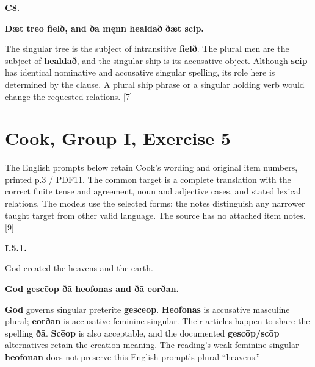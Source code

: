 \par\begin{minipage}{\linewidth}\raggedright
\textbf{C8.}

\textbf{Ðæt trēo fielð, and ðā męnn healdað ðæt scip.}

The singular tree is the subject of intransitive \textbf{fielð}. The plural men are the subject of \textbf{healdað}, and the singular ship is its accusative object. Although \textbf{scip} has identical nominative and accusative singular spelling, its role here is determined by the clause. A plural ship phrase or a singular holding verb would change the requested relations. [7]

\end{minipage}\par\addvspace{4pt}

\section*{Cook, Group I, Exercise 5}

The English prompts below retain Cook's wording and original item numbers, printed p.3 /\allowbreak{} PDF11. The common target is a complete translation with the correct finite tense and agreement, noun and adjective cases, and stated lexical relations. The models use the selected forms; the notes distinguish any narrower taught target from other valid language. The source has no attached item notes. [9]

\par\begin{minipage}{\linewidth}\raggedright
\textbf{I.5.1.}

God created the heavens and the earth.

\textbf{God gescēop ðā heofonas and ðā eorðan.}

\textbf{God} governs singular preterite \textbf{gescēop}. \textbf{Heofonas} is accusative masculine plural; \textbf{eorðan} is accusative feminine singular. Their articles happen to share the spelling \textbf{ðā}. \textbf{Scēop} is also acceptable, and the documented \textbf{gescōp/\allowbreak{}scōp} alternatives retain the creation meaning. The reading's weak-feminine singular \textbf{heofonan} does not preserve this English prompt's plural “heavens.”

\end{minipage}\par\addvspace{4pt}

